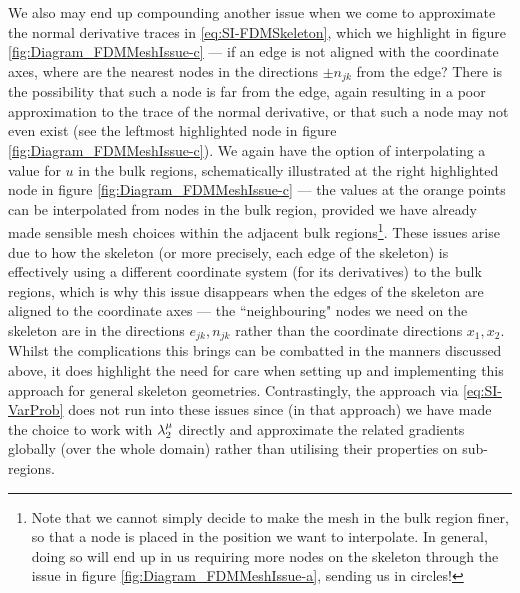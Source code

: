 We also may end up compounding another issue when we come to approximate the normal derivative traces in \eqref{eq:SI-FDMSkeleton}, which we highlight in figure \ref{fig:Diagram_FDMMeshIssue-c} --- if an edge is not aligned with the coordinate axes, where are the nearest nodes in the directions $\pm n_{jk}$ from the edge?
There is the possibility that such a node is far from the edge, again resulting in a poor approximation to the trace of the normal derivative, or that such a node may not even exist (see the leftmost highlighted node in figure \ref{fig:Diagram_FDMMeshIssue-c}).
We again have the option of interpolating a value for $u$ in the bulk regions, schematically illustrated at the right highlighted node in figure \ref{fig:Diagram_FDMMeshIssue-c} --- the values at the orange points can be interpolated from nodes in the bulk region, provided we have already made sensible mesh choices within the adjacent bulk regions\footnote{Note that we cannot simply decide to make the mesh in the bulk region finer, so that a node is placed in the position we want to interpolate. In general, doing so will end up in us requiring more nodes on the skeleton through the issue in figure \ref{fig:Diagram_FDMMeshIssue-a}, sending us in circles!}.
These issues arise due to how the skeleton (or more precisely, each edge of the skeleton) is effectively using a different coordinate system (for its derivatives) to the bulk regions, which is why this issue disappears when the edges of the skeleton are aligned to the coordinate axes --- the ``neighbouring" nodes we need on the skeleton are in the directions $e_{jk}, n_{jk}$ rather than the coordinate directions $x_1, x_2$.
Whilst the complications this brings can be combatted in the manners discussed above, it does highlight the need for care when setting up and implementing this approach for general skeleton geometries.
Contrastingly, the approach via \eqref{eq:SI-VarProb} does not run into these issues since (in that approach) we have made the choice to work with $\lambda_2^{\mu}$ directly and approximate the related gradients globally (over the whole domain) rather than utilising their properties on sub-regions.

